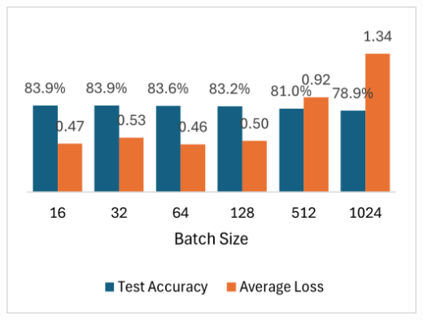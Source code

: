 \documentclass{article}
\begin{document}
\begin{center}
\begin{minipage}{0.3\textwidth}
    \end{minipage}
    \begin{minipage}{0.3\textwidth}
        \centering
        \includegraphics[width=\textwidth]{figure/batch.png}
    \end{minipage}
\end{center}
\end{document}
